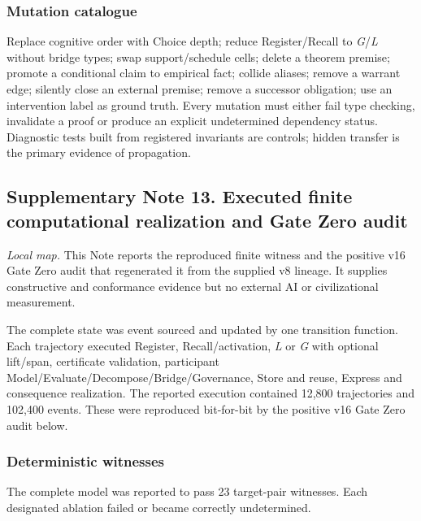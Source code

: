 \hypertarget{mutation-catalogue}{%
\subsubsection{Mutation catalogue}\label{mutation-catalogue}}

Replace cognitive order with Choice depth; reduce Register/Recall to
\emph{G}/\emph{L} without bridge types; swap support/schedule cells;
delete a theorem premise; promote a conditional claim to empirical fact;
collide aliases; remove a warrant edge; silently close an external
premise; remove a successor obligation; use an intervention label as
ground truth. Every mutation must either fail type checking, invalidate
a proof or produce an explicit undetermined dependency status.
Diagnostic tests built from registered invariants are controls; hidden
transfer is the primary evidence of propagation.

\hypertarget{supplementary-note-13.-executed-finite-computational-realization-and-gate-zero-audit}{%
\subsection{Supplementary Note 13. Executed finite computational
realization and Gate Zero
audit}\label{supplementary-note-13.-executed-finite-computational-realization-and-gate-zero-audit}}

\emph{Local map.} This Note reports the reproduced finite witness and
the positive v16 Gate Zero audit that regenerated it from the supplied
v8 lineage. It supplies constructive and conformance evidence but no
external AI or civilizational measurement.

The complete state was event sourced and updated by one transition
function. Each trajectory executed Register, Recall/activation, \emph{L}
or \emph{G} with optional lift/span, certificate validation, participant
Model/Evaluate/Decompose/Bridge/Governance, Store and reuse, Express and
consequence realization. The reported execution contained 12,800
trajectories and 102,400 events. These were reproduced bit-for-bit by
the positive v16 Gate Zero audit below.

\hypertarget{deterministic-witnesses}{%
\subsubsection{Deterministic witnesses}\label{deterministic-witnesses}}

The complete model was reported to pass 23 target-pair witnesses. Each
designated ablation failed or became correctly undetermined.

